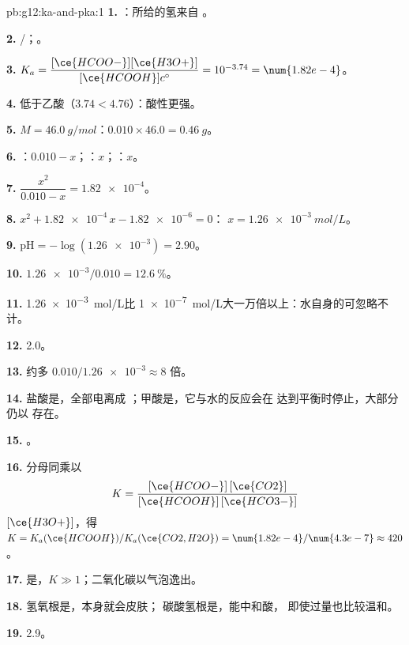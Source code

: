 \begin{solution}{pb:g12:ka-and-pka:1}
\textbf{1.} ：所给的氢来自 。

\textbf{2.} /；。

\textbf{3.} $K_a = \dfrac{[\ce{HCOO-}][\ce{H3O+}]}{[\ce{HCOOH}]c^\circ} =
10^{-3.74} = \num{1.82e-4}$。

\textbf{4.}  低于乙酸（$3.74 < 4.76$）：酸性更强。

\textbf{5.} $M = \qty{46.0}{g/mol}$：$0.010 \times 46.0 = \qty{0.46}{g}$。

\textbf{6.} ：$0.010 - x$；：$x$；：$x$。

\textbf{7.} $\dfrac{x^2}{0.010 - x} = \num{1.82e-4}$。

\textbf{8.} $x^2 + \num{1.82e-4}\,x - \num{1.82e-6} = 0$：
$x = \qty{1.26e-3}{mol/L}$。

\textbf{9.} $\mathrm{pH} = -\log(\num{1.26e-3}) = 2.90$。

\textbf{10.} $\num{1.26e-3}/0.010 = \qty{12.6}{\percent}$。

\textbf{11.} \qty{1.26e-3}{mol/L}比
\qty{1e-7}{mol/L}大一万倍以上：水自身的可忽略不计。

\textbf{12.}  2.0。

\textbf{13.} 约多 $0.010 / \num{1.26e-3} \approx 8$ 倍。

\textbf{14.} 盐酸是，全部电离成
；甲酸是，它与水的反应会在
达到平衡时停止，大部分仍以  存在。

\textbf{15.} 。

\textbf{16.} 分母同乘以
\[
  K = \frac{[\ce{HCOO-}]\,[\ce{CO2}]}{[\ce{HCOOH}]\,[\ce{HCO3-}]}
\]
$[\ce{H3O+}]$，得 $K = K_a(\ce{HCOOH}) / K_a(\ce{CO2,H2O}) =
\num{1.82e-4}/\num{4.3e-7} \approx 420$。

\textbf{17.} 是，$K \gg 1$；二氧化碳以气泡逸出。

\textbf{18.} 氢氧根是，本身就会皮肤；
碳酸氢根是，能中和酸，
即使过量也比较温和。

\textbf{19.}  2.9。
\end{solution}
